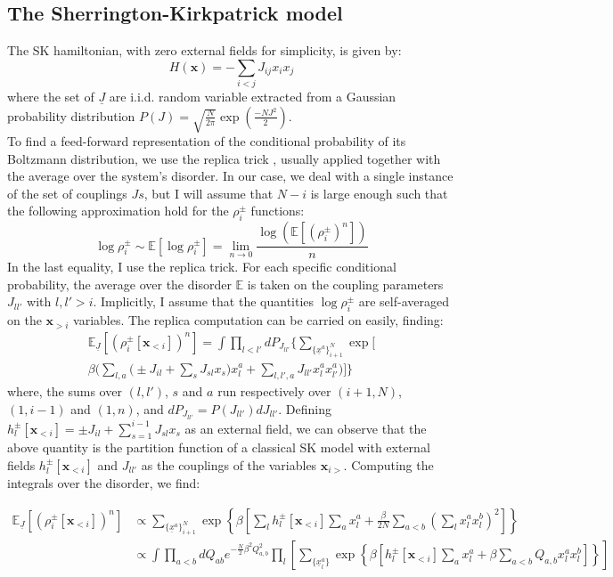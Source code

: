 \documentclass[aps,physrev,10pt,floatfix,reprint]{revtex4-2}
\begin{document}
\subsection{The Sherrington-Kirkpatrick model}
The SK hamiltonian, with zero external fields for simplicity, is given by:
\begin{equation}
H\left(\mathbf{x}\right)=-\sum_{i<j}J_{ij}x_{i}x_{j}
\end{equation}
where the set of $\underline{J}$ are i.i.d. random variable extracted from a Gaussian probability distribution $P(J)=\sqrt{\frac{N}{2\pi}}\exp\left(\frac{-NJ^2}{2} \right)$. \\
To find a feed-forward representation of the conditional probability of its Boltzmann distribution, we use the replica trick \cite{10.1142/0271}, usually applied together with the average over the system's disorder. In our case, we deal with a single instance of the set of couplings $Js$, but I will assume that $N-i$ is large enough such that the following approximation hold for the $\rho_i^{\pm}$ functions: 
\[
\log\rho_i^{\pm} \sim \mathbb{E}\left[  \log\rho_i^{\pm} \right] = \lim_{n\rightarrow 0} \frac{  \log(\mathbb{E}\left[(\rho_i^{\pm})^n \right])}{n}
\]
In the last equality, I use the replica trick. 
For each specific conditional probability, the average over the disorder $\mathbb{E}$ is taken on the coupling parameters $J_{ll'}$ with $l,l'>i$. Implicitly, I assume that the quantities $\log\rho_i^{\pm}$ are self-averaged on the $\mathbf{x}_{>i}$ variables.
 The replica computation can be carried on easily, finding:
\begin{multline}
\mathbb{E}_{\underline{J}}\left[(\rho_i^{\pm}[\mathbf{x}_{<i}])^n \right]  = 
\int \prod_{l<l'} dP_{J_{ll'}} \bigg\{ 
\sum_{\{\underline{x}^{a}\}_{i+1}^N} \exp\bigg[\\ \beta \bigg( 
\sum_{l,a}\bigg( \pm J_{il}  
+ \sum_{s} J_{sl} x_s \bigg) x_l^{a} + 
\sum_{l,l', a} J_{ll'} x_l^{a} x_{l'}^{a}
\bigg)  \bigg] 
\bigg\}
\end{multline}
where, the sums over $(l,l')$, $s$ and $a$ run respectively over $(i+1,N)$, $(1,i-1)$ and $(1,n)$, and $dP_{J_{ll'}}=P(J_{ll'})dJ_{ll'}$. Defining $h_l^{\pm}[\mathbf{x}_{<i}] =\pm J_{il} + \sum_{s=1}^{i-1} J_{sl} x_s$ as an external field, we can observe that the above quantity is the partition function of a classical SK model with external fields $h_l^{\pm}[\mathbf{x}_{<i}]$ and $J_{ll'}$ as the couplings of the variables $\mathbf{x}_{i>}$.  
Computing the integrals over the disorder, we find: 
\begin{widetext}
\begin{align}
\mathbb{E}_{\underline{J}}\left[(\rho_i^{\pm}[\mathbf{x}_{<i}])^n \right]
& \propto  
\sum_{\{\underline{x}^{a}\}_{i+1}^N} 
\exp\left\{\beta \left[
\sum_{l} h_l^{\pm}[\mathbf{x}_{<i}] \sum_{a} x_l^{a} +\frac{\beta}{2N} \sum_{a<b} \left( \sum_{l}  x_l^{a} x_l^{b} \right)^2 \right]  \right\}\\
& \propto  \int \prod_{a<b} dQ_{ab} e^{-\frac{N}{2}\beta^2Q_{a,b}^2}
\prod_{l} \left[
\sum_{\{\underline{x}^{a}_l\}} 
\exp\left\{\beta \left[
h_l^{\pm}[\mathbf{x}_{<i}] \sum_{a} x_l^{a} +\beta \sum_{a<b} Q_{a,b}  x_l^{a} x_l^{b} \right]  \right\}
\right]
\end{align}
\end{widetext}
\end{document}
